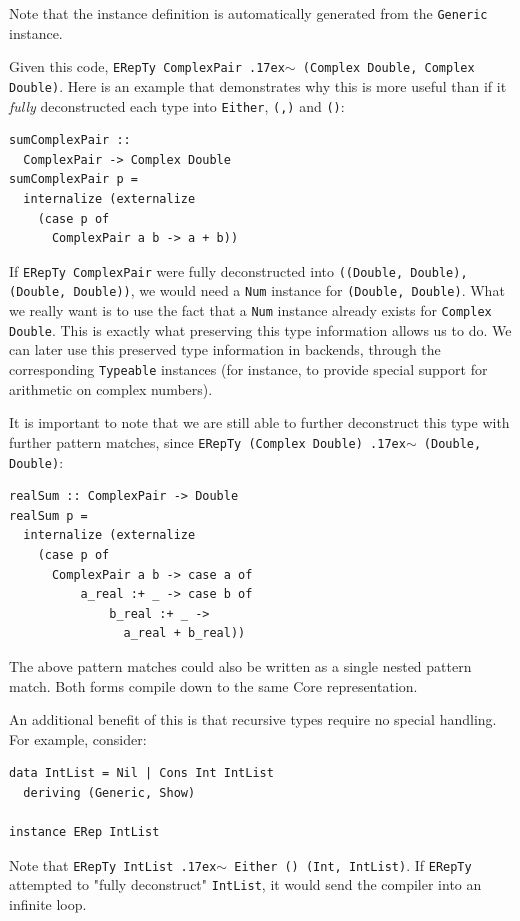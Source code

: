 \documentclass[runningheads, a4paper]{llncs}
\newcommand{\typeeq}{\raise.17ex\hbox{$\scriptstyle\mathtt{\sim}$}\,\;}
\newcommand{\ttt}{\texttt}
\begin{document}
Note that the instance definition is automatically generated from the
\ttt{Generic} instance.

Given this code, \ttt{ERepTy ComplexPair \typeeq (Complex Double, Complex Double)}. Here
is an example that demonstrates why this is more useful than if it \textit{fully} deconstructed
each type into \ttt{Either}, \ttt{(,)} and \ttt{()}:

\begin{lstlisting}
sumComplexPair ::
  ComplexPair -> Complex Double
sumComplexPair p =
  internalize (externalize
    (case p of
      ComplexPair a b -> a + b))
\end{lstlisting}

If \ttt{ERepTy ComplexPair} were fully deconstructed into \ttt{((Double, Double),
(Double, Double))}, we would need a \ttt{Num} instance for \ttt{(Double,
Double)}.  What we really want is to use the fact that a \ttt{Num} instance
already exists for \ttt{Complex Double}. This is exactly what preserving this
type information allows us to do. We can later use this preserved type
information in backends, through the corresponding \ttt{Typeable} instances (for
instance, to provide special support for arithmetic on complex numbers).

It is important to note that we are still able to further deconstruct this type
with further pattern matches, since \ttt{ERepTy (Complex Double) \typeeq (Double, Double)}:

\begin{lstlisting}
realSum :: ComplexPair -> Double
realSum p =
  internalize (externalize
    (case p of
      ComplexPair a b -> case a of
          a_real :+ _ -> case b of
              b_real :+ _ ->
                a_real + b_real))
\end{lstlisting}

The above pattern matches could also be written as a single nested pattern
match. Both forms compile down to the same Core representation.

An additional benefit of this is that recursive types require no special handling. For
example, consider:

\begin{lstlisting}
data IntList = Nil | Cons Int IntList
  deriving (Generic, Show)

instance ERep IntList
\end{lstlisting}

Note that \ttt{ERepTy IntList \typeeq Either () (Int, IntList)}. If \ttt{ERepTy}
attempted to "fully deconstruct" \ttt{IntList}, it would send the compiler
into an infinite loop.
\end{document}

